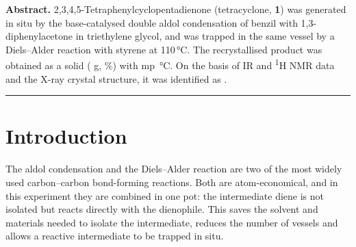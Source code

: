 \documentclass[11pt,a4paper]{article}
\begin{document}


\noindent\textbf{Abstract.} 2,3,4,5-Tetraphenylcyclopentadienone (tetracyclone, \textbf{1}) was generated in situ by the base-catalysed double aldol condensation of benzil with 1,3-diphenylacetone in triethylene glycol, and was trapped in the same vessel by a Diels--Alder reaction with styrene at 110\,\si{\celsius}. The recrystallised product was obtained as a  solid ( g, \%) with mp \,\si{\celsius}. On the basis of IR and \textsuperscript{1}H NMR data and the X-ray crystal structure, it was identified as .

\noindent\rule{\linewidth}{0.6pt}

\section{Introduction}

The aldol condensation and the Diels--Alder reaction are two of the most widely used carbon--carbon bond-forming reactions. Both are atom-economical,\cite{Trost1991} and in this experiment they are combined in one pot: the intermediate diene is not isolated but reacts directly with the dienophile. This saves the solvent and materials needed to isolate the intermediate, reduces the number of vessels and allows a reactive intermediate to be trapped in situ.\cite{L2}
\end{document}
